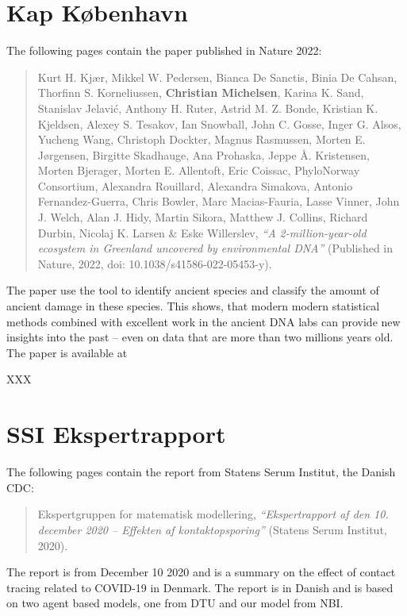 
\chapter{Kap København}
\label{appendix:kapk}

The following pages contain the paper published in Nature 2022:

\begin{quote}
    Kurt H. Kjær, Mikkel W. Pedersen, Bianca De Sanctis, Binia De Cahsan, Thorfinn S. Korneliussen, \textbf{Christian Michelsen}, Karina K. Sand, Stanislav Jelavić, Anthony H. Ruter, Astrid M. Z. Bonde, Kristian K. Kjeldsen, Alexey S. Tesakov, Ian Snowball, John C. Gosse, Inger G. Alsos, Yucheng Wang, Christoph Dockter, Magnus Rasmussen, Morten E. Jørgensen, Birgitte Skadhauge, Ana Prohaska, Jeppe Å. Kristensen, Morten Bjerager, Morten E. Allentoft, Eric Coissac, PhyloNorway Consortium, Alexandra Rouillard, Alexandra Simakova, Antonio Fernandez-Guerra, Chris Bowler, Marc Macias-Fauria, Lasse Vinner, John J. Welch, Alan J. Hidy, Martin Sikora, Matthew J. Collins, Richard Durbin, Nicolaj K. Larsen \& Eske Willerslev, \emph{``A 2-million-year-old ecosystem in Greenland uncovered by environmental DNA''} (Published in Nature, 2022, doi: 10.1038/s41586-022-05453-y).
\end{quote}
The paper use the \metaDMG tool to identify ancient species and classify the amount of ancient damage in these species.  This shows, that modern modern statistical methods combined with excellent work in the ancient DNA labs can provide new insights into the past -- even on data that are more than two millions years old. The paper is available at %

\clearpage
% 
XXX



\chapter{SSI Ekspertrapport}
\label{appendix:ssi-report}

The following pages contain the report from Statens Serum Institut, the Danish CDC:
\begin{quote}
    Ekspertgruppen for matematisk modellering, \emph{``Ekspertrapport af den 10. december 2020 -- Effekten af kontaktopsporing''} (Statens Serum Institut, 2020).
\end{quote}
The report is from December 10 2020 and is a summary on the effect of contact tracing related to COVID-19 in Denmark. The report is in Danish and is based on two agent based models, one from DTU and our model from NBI.

